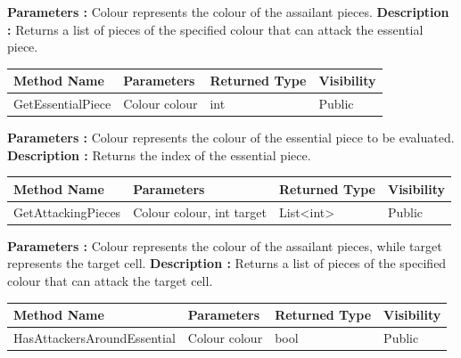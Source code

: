 \documentclass[12pt]{article}
\begin{document}
\textbf{Parameters :} Colour represents the colour of the assailant pieces. 
\textbf{Description :} Returns a list of pieces of the specified colour that can attack the essential piece.  

\begin{table}[H]
    \begin{tabular}{|l|l|l|l|}
    \hline
    \rowcolor[HTML]{EFEFEF} 
    \cellcolor[HTML]{EFEFEF}\textbf{Method Name} & \textbf{Parameters}     & \textbf{Returned Type} & \textbf{Visibility} \\ \hline
    GetEssentialPiece                            & Colour colour           & int                   & Public              \\ \hline
    \end{tabular}
\end{table}

\textbf{Parameters :} Colour represents the colour of the essential piece to be evaluated.  
\textbf{Description :} Returns the index of the essential piece.  

\begin{table}[H]
    \begin{tabular}{|l|l|l|l|}
    \hline
    \rowcolor[HTML]{EFEFEF} 
    \cellcolor[HTML]{EFEFEF}\textbf{Method Name} & \textbf{Parameters}        & \textbf{Returned Type} & \textbf{Visibility} \\ \hline
    GetAttackingPieces                           & Colour colour, int target  & List<int>                   & Public              \\ \hline
    \end{tabular}
\end{table}

\textbf{Parameters :} Colour represents the colour of the assailant pieces, while target represents the target cell.   
\textbf{Description :} Returns a list of pieces of the specified colour that can attack the target cell. 

\begin{table}[H]
    \begin{tabular}{|l|l|l|l|}
    \hline
    \rowcolor[HTML]{EFEFEF} 
    \cellcolor[HTML]{EFEFEF}\textbf{Method Name} & \textbf{Parameters}     & \textbf{Returned Type} & \textbf{Visibility} \\ \hline
    HasAttackersAroundEssential                  & Colour colour           & bool                   & Public              \\ \hline
    \end{tabular}
\end{table}
\end{document}
